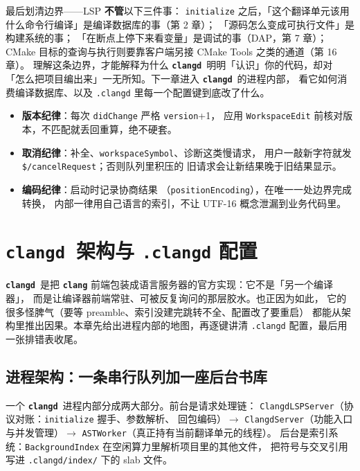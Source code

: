 \documentclass[12pt,a4paper,fontset=fandol]{ctexbook}
\newcommand{\Lib}[1]{\textbf{\texttt{#1}}}
\newcommand{\CD}{\Lib{clangd}}
\begin{document}
最后划清边界——LSP \textbf{不管}以下三件事：
\texttt{initialize} 之后，「这个翻译单元该用什么命令行编译」是编译数据库的事（第 2 章）；
「源码怎么变成可执行文件」是构建系统的事；
「在断点上停下来看变量」是调试的事（DAP，第 7 章）；
CMake 目标的查询与执行则要靠客户端另接 CMake Tools 之类的通道（第 16 章）。
理解这条边界，才能解释为什么 \CD\ 明明「认识」你的代码，却对
「怎么把项目编出来」一无所知。下一章进入 \CD\ 的进程内部，
看它如何消费编译数据库、以及 \texttt{.clangd} 里每一个配置键到底改了什么。

\begin{bestpractice}[title={实现客户端时守住三条纪律}]
\begin{itemize}
  \item \textbf{版本纪律}：每次 \texttt{didChange} 严格 \texttt{version}+1，
        应用 \texttt{WorkspaceEdit} 前核对版本，不匹配就丢回重算，绝不硬套。
  \item \textbf{取消纪律}：补全、\texttt{workspaceSymbol}、诊断这类慢请求，
        用户一敲新字符就发 \texttt{\$/cancelRequest}；否则队列里积压的
        旧请求会让新结果晚于旧结果显示。
  \item \textbf{编码纪律}：启动时记录协商结果
        （\texttt{positionEncoding}），在唯一一处边界完成转换，
        内部一律用自己语言的索引，不让 UTF-16 概念泄漏到业务代码里。
\end{itemize}
\end{bestpractice}

\chapter{\CD\ 架构与 \texttt{.clangd} 配置}\label{ch:clangd}

\CD\ 是把 \Lib{clang} 前端包装成语言服务器的官方实现：它不是「另一个编译器」，
而是让编译器前端常驻、可被反复询问的那层胶水。也正因为如此，
它的很多怪脾气（要等 preamble、索引没建完跳转不全、配置改了要重启）
都能从架构里推出因果。本章先给出进程内部的地图，再逐键讲清
\texttt{.clangd} 配置，最后用一张排错表收尾。

\section{进程架构：一条串行队列加一座后台书库}\label{sec:ch05-s1}

一个 \CD\ 进程内部分成两大部分。前台是请求处理链：
\texttt{ClangdLSPServer}（协议对账：\texttt{initialize} 握手、参数解析、
回包编码）$\to$ \texttt{ClangdServer}（功能入口与并发管理）$\to$
\texttt{ASTWorker}（真正持有当前翻译单元的线程）。
后台是索引系统：\texttt{BackgroundIndex} 在空闲算力里解析项目里的其他文件，
把符号与交叉引用写进 \texttt{.clangd/}\hspace{0pt}\texttt{index/} 下的 slab 文件。
\end{document}
